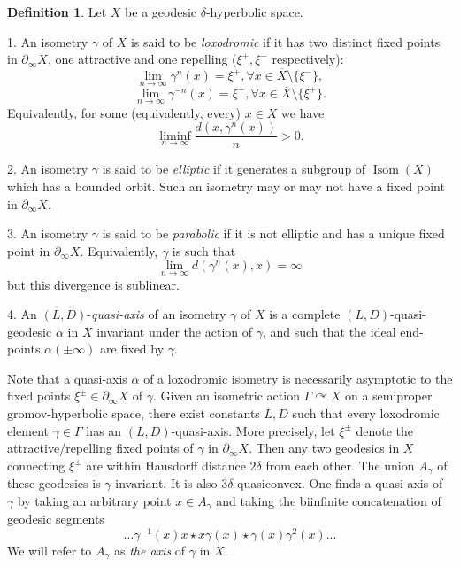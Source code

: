 \documentclass[12pt]{amsbook}%
\theoremstyle{definition}
\newtheorem{defi}[thm]{Definition}
\theoremstyle{remark}
\numberwithin{section}{chapter}
\numberwithin{subsection}{section}
\numberwithin{figure}{chapter}
\DeclareMathOperator{\Isom}{Isom}
\DeclareMathOperator{\acts}{\curvearrowright}
\def\Ga{\Gamma}
\def\ga{\gamma}
\def\geo{\partial_\infty}
\def\ol{\overline}
\begin{document}
\begin{defi}\label{def:axis}
Let $X$ be a geodesic $\delta$-hyperbolic space. %


1. An isometry $\ga$ of $X$ is said to be {\em loxodromic} 
 if it has two distinct fixed points in $\geo X$, one attractive and one repelling 
($\xi^+, \xi^-$ respectively):
$$
\lim_{n\to\infty} \ga^n(x)=\xi^+, \forall x\in \ol{X}\setminus \{\xi^-\}, 
$$
$$
\lim_{n\to\infty} \ga^{-n}(x)=\xi^-, \forall x\in \ol{X}\setminus \{\xi^+\}. 
$$
Equivalently, for some (equivalently, every) $x\in X$ we have 
$$
\liminf_{n\to\infty} \frac{d(x, \ga^n(x))}{n}>0. 
$$

2. An isometry $\ga$ is said to be {\em elliptic}  
 if it generates a subgroup of $\Isom(X)$ which has a bounded  orbit. Such an isometry may or may not have a 
fixed point in $\geo X$. 

3. An isometry $\ga$ is said to be {\em parabolic}  
if it is not elliptic and has a unique fixed point in $\geo X$. Equivalently, $\ga$ is such that 
$$\lim_{n\to\infty} d(\ga^n(x), x)=\infty$$ but this divergence is sublinear.  

4. An $(L,D)$-{\em quasi-axis} of an isometry $\gamma$ of $X$ is a complete $(L,D)$-quasi-geodesic $\alpha$ in $X$  
invariant under the action of $\gamma$, and such that the ideal end-points $\alpha(\pm \infty)$ are fixed by $\gamma$. 
\end{defi}

Note that a quasi-axis $\alpha$ of a loxodromic isometry is necessarily asymptotic to the fixed points $\xi^\pm\in \geo X$ of $\gamma$. 
Given an isometric action $\Ga\acts X$ on a semiproper gromov-hyperbolic space, 
there exist constants $L, D$ such that every loxodromic element $\ga\in \Ga$ has an 
$(L,D)$-quasi-axis. More precisely, let $\xi^\pm$ denote the attractive/repelling fixed points of $\ga$ in $\geo X$. Then any two geodesics in $X$ connecting 
$\xi^\pm$ are within Hausdorff distance $2\delta$ from each other. The union $A_\ga$ of these geodesics is $\ga$-invariant. It is also $3\delta$-quasiconvex. 
One finds a quasi-axis of $\ga$ by taking an arbitrary point $x\in A_\ga$ and taking the biinfinite concatenation of geodesic segments 
$$
... \ga^{-1}(x)x \star x \ga(x) \star \ga(x) \ga^2(x) ... 
$$ 
We will refer to $A_\ga$ as {\em the axis} of $\ga$ in $X$. \index{$A_\ga$, the axis of $\ga$} 
\end{document}
